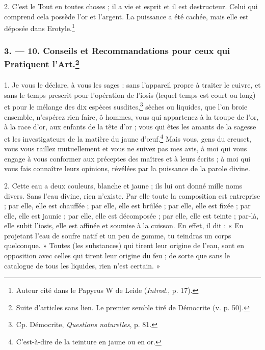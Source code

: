 \documentclass[landscape, a4paper, 11pt, oneside, polutonikogreek, french]{article}
\begin{document}
2. C'est le Tout en toutes choses ; il a vie et esprit et il est destructeur. Celui qui comprend cela possède l'or et l'argent. La puissance a été cachée, mais elle est déposée dans Erotyle.\footnote{Auteur cité dans le Papyrus W de Leide (\emph{Introd.}, p. 17).}

\bigskip
\centerline{\EightStarTaper}
\centerline{\EightStarTaper\EightStarTaper}
\bigskip

\subsubsection[3. --- 10. Conseils et Recommandations pour ceux qui Pratiquent l'Art.]{3. --- 10. Conseils et Recommandations pour ceux qui Pratiquent l'Art.\footnote{Suite d'articles sans lien. Le premier semble tiré de Démocrite (v. p. 50).}}
\paragraph{}
1. Je vous le déclare, à vous les sages : sans l'appareil propre à traiter le cuivre, et sans le temps prescrit pour l'opération de l'iosis (lequel temps est court ou long) et pour le mélange des dix espèces susdites,\footnote{Cp. Démocrite, \emph{Questions naturelles}, p. 81.} sèches ou liquides, que l'on broie ensemble, n'espérez rien faire, ô hommes, vous qui appartenez à la troupe de l'or, à la race d'or, aux enfants de la tête d'or ; vous qui êtes les amants de la sagesse et les investigateurs de la matière du jaune d'œuf.\footnote{C'est-à-dire de la teinture en jaune ou en or. } Mais vous, gens du creuset, vous vous raillez mutuellement et vous ne suivez pas mes avis, à moi qui vous engage à vous conformer aux préceptes des maîtres et à leurs écrits ; à moi qui vous fais connaître leurs opinions, révélées par la puissance de la parole divine.

2. Cette eau a deux couleurs, blanche et jaune ; ils lui ont donné mille noms divers. Sans l'eau divine, rien n'existe. Par elle toute la composition est entreprise ; par elle, elle est chauffée ; par elle, elle est brûlée ; par elle, elle est fixée ; par elle, elle est jaunie ; par elle, elle est décomposée ; par elle, elle est teinte ; par-là, elle subit l'iosis, elle est affinée et soumise à la cuisson. En effet, il dit : « En projetant l'eau de soufre natif et un peu de gomme, tu teindras un corps quelconque. » Toutes (les substances) qui tirent leur origine de l'eau, sont en opposition avec celles qui tirent leur origine du feu ; de sorte que sans le catalogue de tous les liquides, rien n'est certain. »
\end{document}
